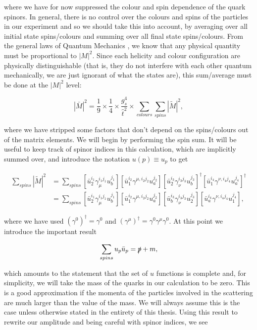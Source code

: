 where we have for now suppressed the colour and spin dependence of the quark spinors. In general, there is no control over the colours and spins of the particles in our experiment and so we should take this into account, by averaging over all initial state spins/colours and summing over all final state spins/colours. From the general laws of Quantum Mechanics \cite{Dirac}, we know that any physical quantity must be proportional to $|M|^2$. Since each helicity and colour configuration are physically distinguishable (that is, they do not interfere with each other quantum mechanically, we are just ignorant of what the states are), this sum/average must be done at the $|M|^2$ level: 

\begin{equation}
|\bar{M}|^2 = \frac{1}{9} \times \frac{1}{4} \times \frac{g_s^4}{\hat{t}^2} \times \sum_{colours}  \sum_{spins} |\tilde{M}|^2,
\end{equation}

where we have stripped some factors that don't depend on the spins/colours out of the matrix elements. We will begin by performing the spin sum. It will be useful to keep track of spinor indices in this calculation, which are implicitly summed over, and introduce the notation $u(p) \equiv u_p$ to get

\begin{equation}
\begin{split}
\sum_{spins}|\tilde{M}|^2 &= \sum_{spins}  [\bar{u}_2^{i_1} \gamma_\mu^{i_1 j_1} u_b^{j_1}][\bar{u}_1^{i_2}\gamma^{\mu, i_2 j_2} u_a^{j_2}] [\bar{u}_2^{i_3}\gamma_\nu^{i_3 j_3} u_b^{j_3}]^\dagger [\bar{u}_1^{i_4}\gamma^{\nu, i_4 j_4} u_a^{j_4}]^\dagger \\
&= \sum_{spins}  [\bar{u}_2^{i_1} \gamma_\mu^{i_1 j_1} u_b^{j_1}][\bar{u}_1^{i_2}\gamma^{\mu, i_2 j_2} u_a^{j_2}] [\bar{u}_b^{i_3} \gamma_\nu^{i_3 j_3}  u_2^{j_3}][\bar{u}_a^{i_4}  \gamma^{\nu, i_4 j_4} u_1^{j_4}],
\end{split}
\end{equation}

where we have used $(\gamma^0)^\dagger = \gamma^0$ and $(\gamma^\mu)^\dagger = \gamma^0 \gamma^\mu \gamma^0$. At this point we introduce the important result

\begin{equation}
\sum_{spins} u_p \bar{u}_p = \slashed{p} + m, 
\end{equation}

which amounts to the statement that the set of $u$ functions is complete and, for simplicity, we will take the mass of the quarks in our calculation to be zero. This is a good approximation if the momenta of the particles involved in the scattering are much larger than the value of the mass. We will always assume this is the case unless otherwise stated in the entirety of this thesis. Using this result to rewrite our amplitude and being careful with spinor indices, we see

